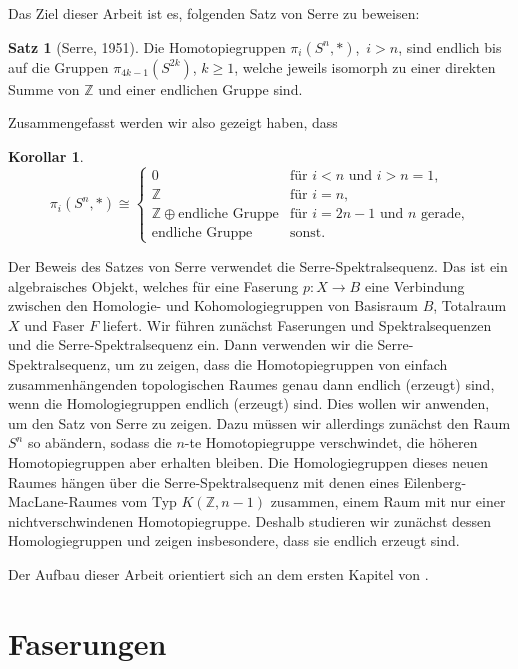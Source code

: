\documentclass[11pt, a4paper, german]{article}
\theoremstyle{definition}
\newtheorem{satz}[lem]{Satz}
\newtheorem{kor}[lem]{Korollar}
\theoremstyle{remark}
\newcommand{\Z}{\mathbb{Z}} %
\begin{document}
Das Ziel dieser Arbeit ist es, folgenden Satz von Serre zu beweisen:

\begin{satz}[Serre, 1951]\label{serre-finiteness}
  Die Homotopiegruppen $\pi_i(S^n, *)$,~$i > n$, sind endlich bis auf die Gruppen $\pi_{4k-1}(S^{2k})$, $k \geq 1$, welche jeweils isomorph zu einer direkten Summe von $\Z$ und einer endlichen Gruppe sind.
\end{satz}

Zusammengefasst werden wir also gezeigt haben, dass

\begin{kor}\mbox{}
  \vspace{-1.4em}
  \[
    \pi_i(S^n, *) \cong \begin{cases}
      0 & \text{für $i < n$ und $i > n = 1$,} \\
      \Z & \text{für $i = n$,} \\
      \Z \oplus \text{endliche Gruppe} & \text{für $i=2n-1$ und $n$ gerade,} \\
      \text{endliche Gruppe} & \text{sonst.}
    \end{cases}
  \]
\end{kor}

Der Beweis des Satzes von Serre verwendet die Serre-Spektralsequenz.
Das ist ein algebraisches Objekt, welches für eine Faserung $p : X \to B$ eine Verbindung zwischen den Homologie- und Kohomologiegruppen von Basisraum $B$, Totalraum $X$ und Faser $F$ liefert.
Wir führen zunächst Faserungen und Spektralsequenzen und die Serre-Spektralsequenz ein.
Dann verwenden wir die Serre-Spektralsequenz, um zu zeigen, dass die Homotopiegruppen von einfach zusammenhängenden topologischen Raumes genau dann endlich (erzeugt) sind, wenn die Homologiegruppen endlich (erzeugt) sind.
Dies wollen wir anwenden, um den Satz von Serre zu zeigen.
Dazu müssen wir allerdings zunächst den Raum $S^n$ so abändern, sodass die $n$-te Homotopiegruppe verschwindet, die höheren Homotopiegruppen aber erhalten bleiben.
Die Homologiegruppen dieses neuen Raumes hängen über die Serre-Spektralsequenz mit denen eines Eilenberg-MacLane-Raumes vom Typ $K(\Z, n{-}1)$ zusammen, einem Raum mit nur einer nichtverschwindenen Homotopiegruppe.
Deshalb studieren wir zunächst dessen Homologiegruppen und zeigen insbesondere, dass sie endlich erzeugt sind.

Der Aufbau dieser Arbeit orientiert sich an dem ersten Kapitel von \cite{hatcher:ss}.

\section{Faserungen}
\end{document}
